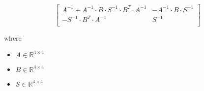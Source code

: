 \documentclass[12pt]{article}
\begin{document}
\[
\begin{bmatrix}
\textit{A}^{-1} + \textit{A}^{-1} \cdot \textit{B} \cdot \textit{S}^{-1} \cdot \textit{B}^T \cdot \textit{A}^{-1} & -\textit{A}^{-1} \cdot \textit{B} \cdot \textit{S}^{-1}\\
-\textit{S}^{-1} \cdot \textit{B}^T \cdot \textit{A}^{-1} & \textit{S}^{-1}\\
\end{bmatrix}
\]

where
\begin{itemize}
\item $\textit{A} \in \mathbb{R}^{ 4 \times 4 }$
\item $\textit{B} \in \mathbb{R}^{ 4 \times 4 }$
\item $\textit{S} \in \mathbb{R}^{ 4 \times 4 }$
\end{itemize}
\end{document}
